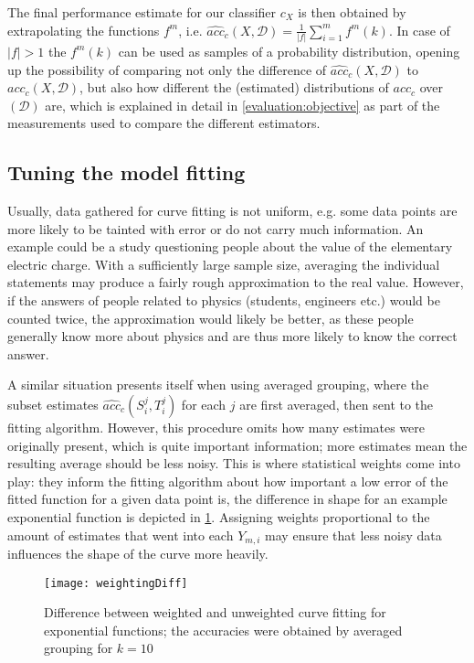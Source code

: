 The final performance estimate for our classifier $c_X$ is then obtained by extrapolating the functions $f^m$, i.e. $\widehat{acc}_c(X, \mathcal{D}) = \frac{1}{|f|} \sum_{i=1}^{m} f^m(k)$. In case of $|f| > 1$ the $f^m(k)$ can be used as samples of a probability distribution, opening up the possibility of comparing not only the difference of $\widehat{acc}_c(X, \mathcal{D})$ to $acc_c(X, \mathcal{D})$, but also how different the (estimated) distributions of $acc_c$ over $\mathcal{(D)}$ are, which is explained in detail in \ref{evaluation:objective} as part of the measurements used to compare the different estimators.

\subsection{Tuning the model fitting}
Usually, data gathered for curve fitting is not uniform, e.g. some data points are more likely to be tainted with error or do not carry much information. An example could be a study questioning people about the value of the elementary electric charge. With a sufficiently large sample size, averaging the individual statements may produce a fairly rough approximation to the real value. However, if the answers of people related to physics (students, engineers etc.) would be counted twice, the approximation would likely be better, as these people generally know more about physics and are thus more likely to know the correct answer.

A similar situation presents itself when using averaged grouping, where the subset estimates $\widehat{acc}_c(S^j_i, T^j_i)$ for each $j$ are first averaged, then sent to the fitting algorithm. However, this procedure omits how many estimates were originally present, which is quite important information; more estimates mean the resulting average should be less noisy. This is where statistical weights come into play: they inform the fitting algorithm about how important a low error of the fitted function for a given data point is, the difference in shape for an example exponential function is depicted in \ref{fig:weigthingExample}. Assigning weights proportional to the amount of estimates that went into each $Y_{m,i}$ may ensure that less noisy data influences the shape of the curve more heavily.

\begin{figure}[h]
	\centering
	\texttt{[image: weightingDiff]}
	\caption{Difference between weighted and unweighted curve fitting for exponential functions; the accuracies were obtained by averaged grouping for $k = 10$}
	\label{fig:weigthingExample}
\end{figure}

